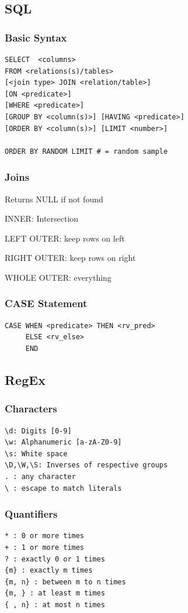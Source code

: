 \documentclass[8pt]{extarticle}
\begin{document}
\subsection*{SQL}
\subsubsection*{Basic Syntax}
\begin{verbatim}
SELECT  <columns>
FROM <relations(s)/tables>
[<join type> JOIN <relation/table>] 
[ON <predicate>]
[WHERE <predicate>]
[GROUP BY <column(s)>] [HAVING <predicate>]
[ORDER BY <column(s)>] [LIMIT <number>]

ORDER BY RANDOM LIMIT # = random sample
\end{verbatim}

\subsubsection*{Joins}
Returns NULL if not found\par
INNER: Intersection\par
LEFT OUTER: keep rows on left\par
RIGHT OUTER: keep rows on right\par
WHOLE OUTER: everything\par


\subsubsection*{CASE Statement}
\begin{verbatim}
CASE WHEN <predicate> THEN <rv_pred> 
     ELSE <rv_else>
     END
\end{verbatim}
\hline

\subsection*{RegEx}
\subsubsection*{Characters}
\begin{verbatim}
\d: Digits [0-9]
\w: Alphanumeric [a-zA-Z0-9]
\s: White space
\D,\W,\S: Inverses of respective groups
. : any character
\ : escape to match literals
\end{verbatim}

\subsubsection*{Quantifiers}
\begin{verbatim}
* : 0 or more times
+ : 1 or more times
? : exactly 0 or 1 times
{m} : exactly m times
{m, n} : between m to n times
{m, } : at least m times
{ , n} : at most n times
\end{verbatim}
\end{document}
